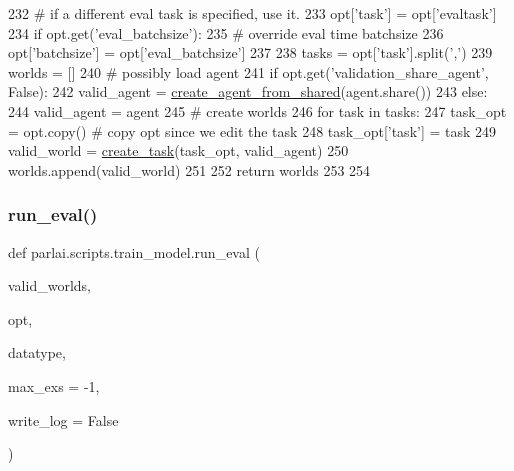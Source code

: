 \begin{DoxyCode}
232         \textcolor{comment}{# if a different eval task is specified, use it.}
233         opt[\textcolor{stringliteral}{'task'}] = opt[\textcolor{stringliteral}{'evaltask'}]
234     \textcolor{keywordflow}{if} opt.get(\textcolor{stringliteral}{'eval\_batchsize'}):
235         \textcolor{comment}{# override eval time batchsize}
236         opt[\textcolor{stringliteral}{'batchsize'}] = opt[\textcolor{stringliteral}{'eval\_batchsize'}]
237 
238     tasks = opt[\textcolor{stringliteral}{'task'}].split(\textcolor{stringliteral}{','})
239     worlds = []
240     \textcolor{comment}{# possibly load agent}
241     \textcolor{keywordflow}{if} opt.get(\textcolor{stringliteral}{'validation\_share\_agent'}, \textcolor{keyword}{False}):
242         valid\_agent = \hyperlink{namespaceparlai_1_1core_1_1agents_aa5af5dd1d2f9da491b60348d479b849f}{create\_agent\_from\_shared}(agent.share())
243     \textcolor{keywordflow}{else}:
244         valid\_agent = agent
245     \textcolor{comment}{# create worlds}
246     \textcolor{keywordflow}{for} task \textcolor{keywordflow}{in} tasks:
247         task\_opt = opt.copy()  \textcolor{comment}{# copy opt since we edit the task}
248         task\_opt[\textcolor{stringliteral}{'task'}] = task
249         valid\_world = \hyperlink{namespaceparlai_1_1core_1_1worlds_a79969c7ba76d4b3c500f5bb776444dc6}{create\_task}(task\_opt, valid\_agent)
250         worlds.append(valid\_world)
251 
252     \textcolor{keywordflow}{return} worlds
253 
254 
\end{DoxyCode}
\mbox{\label{namespaceparlai_1_1scripts_1_1train__model_a496dfe3bf04da9b55d261b4c8d6229a7}} 
\subsubsection{\texorpdfstring{run\+\_\+eval()}{run\_eval()}}
{\footnotesize\ttfamily def parlai.\+scripts.\+train\+\_\+model.\+run\+\_\+eval (\begin{DoxyParamCaption}\item[{}]{valid\+\_\+worlds,  }\item[{}]{opt,  }\item[{}]{datatype,  }\item[{}]{max\+\_\+exs = {\ttfamily -\/1},  }\item[{}]{write\+\_\+log = {\ttfamily False} }\end{DoxyParamCaption})}

